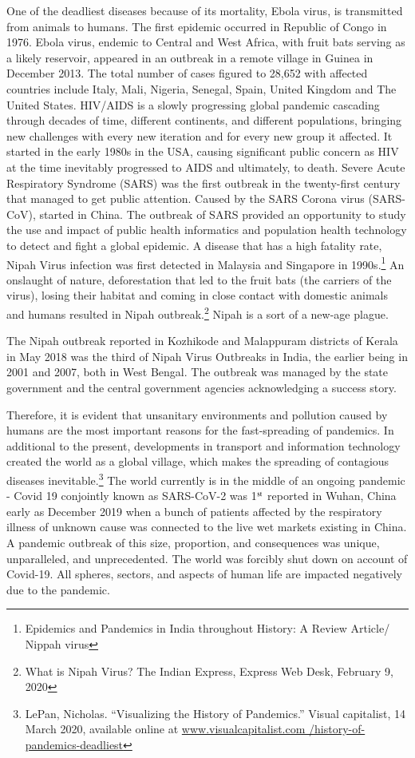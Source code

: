 \begin{multicols}{2}
\noi
One of the deadliest diseases because of its mortality, Ebola virus, is transmitted from
animals to humans. The first epidemic occurred in Republic of Congo in 1976. Ebola virus,
endemic to Central and West Africa, with fruit bats serving as a likely reservoir, appeared in
an outbreak in a remote village in Guinea in December 2013. The total number of cases
figured to 28,652 with affected countries include Italy, Mali, Nigeria, Senegal, Spain, United
Kingdom and The United States. HIV/AIDS is a slowly progressing global pandemic
cascading through decades of time, different continents, and different populations, bringing 
new challenges with every new iteration and for every new group it affected. It started in the
early 1980s in the USA, causing significant public concern as HIV at the time inevitably
progressed to AIDS and ultimately, to death. Severe Acute Respiratory Syndrome (SARS)
was the first outbreak in the twenty-first century that managed to get public attention. Caused
by the SARS Corona virus (SARS-CoV), started in China. The outbreak of SARS provided
an opportunity to study the use and impact of public health informatics and population health
technology to detect and fight a global epidemic. A disease that has a high fatality rate, Nipah
Virus infection was first detected in Malaysia and Singapore in 1990s.\footnote{ Epidemics and Pandemics in India throughout History: A Review Article/ Nippah virus} An onslaught of
nature, deforestation that led to the fruit bats (the carriers of the virus), losing their habitat
and coming in close contact with domestic animals and humans resulted in Nipah outbreak.\footnote{What is Nipah Virus? The Indian Express, Express Web Desk, February 9, 2020}
Nipah is a sort of a new-age plague.

\noi
The Nipah outbreak reported in Kozhikode and Malappuram districts of Kerala in May 2018
was the third of Nipah Virus Outbreaks in India, the earlier being in 2001 and 2007, both in
West Bengal. The outbreak was managed by the state government and the central government
agencies acknowledging a success story.

\noi
Therefore, it is evident that unsanitary environments and pollution caused by humans are the
most important reasons for the fast-spreading of pandemics. In additional to the present,
developments in transport and information technology created the world as a global village,
which makes the spreading of contagious diseases inevitable.\footnote{LePan, Nicholas. “Visualizing the History of Pandemics.” Visual capitalist, 14 March 2020, available online at \url{www.visualcapitalist.com /history-of-pandemics-deadliest}} The world currently is in the middle of an ongoing pandemic - Covid 19 conjointly known as SARS-CoV-2 was 1$^{\rm st}$ reported in Wuhan, China early as December 2019 when a bunch of patients affected by the respiratory illness of unknown cause was connected to the live wet markets existing in China. A pandemic outbreak of this size, proportion, and consequences was unique, unparalleled,
and unprecedented. The world was forcibly shut down on account of Covid-19. All spheres,
sectors, and aspects of human life are impacted negatively due to the pandemic.


\end{multicols}
